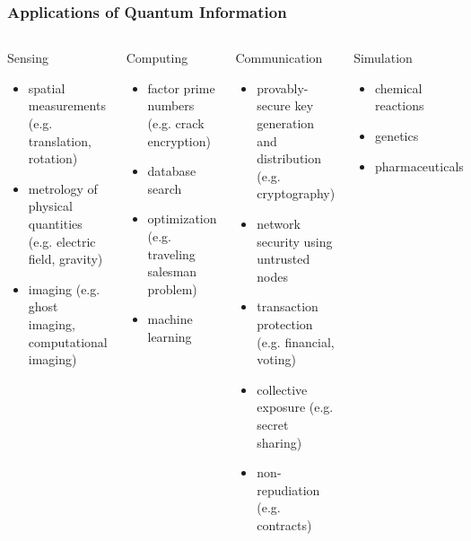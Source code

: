 \documentclass[handout]{beamer}
\begin{document}
\begin{frame}
  \frametitle{Applications of Quantum Information}
  \begin{scriptsize}
      \begin{columns}
    \begin{block}{Sensing}
      \begin{itemize}
      \item spatial measurements (e.g. translation, rotation)
      \item metrology of physical quantities (e.g. electric field, gravity)
      \item imaging (e.g. ghost imaging, computational imaging)
      \end{itemize}
    \end{block}
    
    \begin{block}{Computing}
      \begin{itemize}
      \item factor prime numbers (e.g. crack encryption)
      \item database search
      \item optimization (e.g. traveling salesman problem)
      \item machine learning
      \end{itemize}
    \end{block}

    \begin{block}{Communication}
      \begin{itemize}
      \item provably-secure key generation and distribution
        (e.g. cryptography) 
      \item network security using untrusted nodes
      \item transaction protection (e.g. financial, voting)
      \item collective exposure (e.g. secret sharing)
      \item non-repudiation (e.g. contracts)
      \end{itemize}
    \end{block}

    \begin{block}{Simulation}
      \begin{itemize}
      \item chemical reactions
      \item genetics
      \item pharmaceuticals
      \end{itemize}
    \end{block}

    
  \end{columns}
  \end{scriptsize}
\end{frame}
\end{document}
